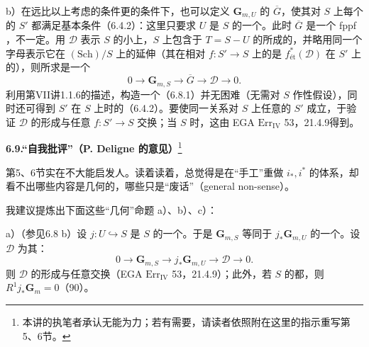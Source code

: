  b）在远比以上考虑的条件更的条件下，也可以定义 $\mathbf G_{m,U}$ 的 $\overline G$，使其对 $S$ 上每个的 $S'$ 都满足基本条件（6.4.2）：这里只要求 $U$ 是 $S$ 的一个。此时 $\overline G$ 是一个 fppf ，不一定。用 $\mathcal D$ 表示 $S$ 的小上，$S$ 上包含于 $T=S-U$ 的所成的，并略用同一个字母表示它在 $(\mathrm{Sch})/S$ 上的延伸（其在相对 $f:S'\to S$ 上的是 $f_{\text{ét}}^*(\mathcal D)$ 在 $S'$ 上的），则所求是一个
\[
0\longrightarrow\mathbf G_{m,S}\longrightarrow\overline G\longrightarrow\mathcal D\longrightarrow0.\tag{6.8.1}
\]
利用第VII讲1.1.6的描述，构造一个（6.8.1）并无困难（无需对 $S$ 作性假设），同时还可得到 $S'$ 在 $S$ 上时的（6.4.2）。要使同一关系对 $S$ 上任意的 $S'$ 成立，于验证 $\mathcal D$ 的形成与任意 $f:S'\to S$ 交换；当 $S$ 时，这由 EGA $\mathrm{Err}_{\mathrm{IV}}$ 53，21.4.9得到。

\textbf{6.9.“自我批评”（P. Deligne 的意见）}\footnote{本讲的执笔者承认无能为力；若有需要，请读者依照附在这里的指示重写第5、6节。}

第5、6节实在不大能启发人。读着读着，总觉得是在“手工”重做 $i_*,i^*$ 的体系，却看不出哪些内容是几何的，哪些只是“废话”（general non-sense）。

我建议提炼出下面这些“几何”命题 a）、b）、c）：

 a）（参见6.8 b）设 $j:U\hookrightarrow S$ 是 $S$ 的一个。于是 $\mathbf G_{m,S}$ 等同于 $j_*\mathbf G_{m,U}$ 的一个。设 $\mathcal D$ 为其：
\[
0\longrightarrow\mathbf G_{m,S}\longrightarrow j_*\mathbf G_{m,U}\longrightarrow\mathcal D\longrightarrow0.
\]
则 $\mathcal D$ 的形成与任意交换（EGA $\mathrm{Err}_{\mathrm{IV}}$ 53，21.4.9）；此外，若 $S$ 的都，则 $R^1j_*\mathbf G_m=0$（90）。

